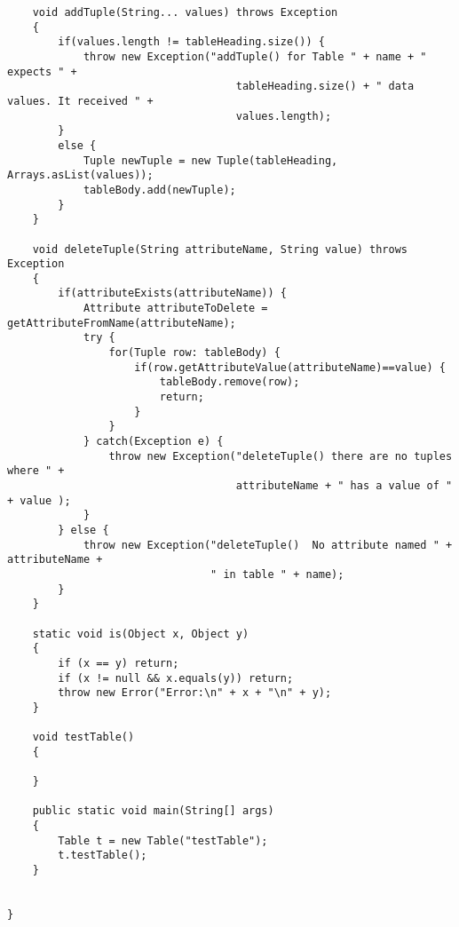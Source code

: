 \documentclass[11pt]{article} %
\begin{document}
\begin{lstlisting}
    void addTuple(String... values) throws Exception
    {
        if(values.length != tableHeading.size()) {
            throw new Exception("addTuple() for Table " + name + " expects " +
                                    tableHeading.size() + " data values. It received " +
                                    values.length);
        }
        else {
            Tuple newTuple = new Tuple(tableHeading, Arrays.asList(values));
            tableBody.add(newTuple);
        }
    }
    
    void deleteTuple(String attributeName, String value) throws Exception
    {
        if(attributeExists(attributeName)) {
            Attribute attributeToDelete = getAttributeFromName(attributeName);
            try {
                for(Tuple row: tableBody) {
                    if(row.getAttributeValue(attributeName)==value) {
                        tableBody.remove(row);
                        return;
                    }
                }
            } catch(Exception e) {
                throw new Exception("deleteTuple() there are no tuples where " +
                                    attributeName + " has a value of " + value );
            }
        } else {
            throw new Exception("deleteTuple()  No attribute named " + attributeName +
                                " in table " + name);
        }
    }

    static void is(Object x, Object y)
    {
        if (x == y) return;
        if (x != null && x.equals(y)) return;
        throw new Error("Error:\n" + x + "\n" + y);
    }

    void testTable()
    {
        
    }

    public static void main(String[] args)
    {
        Table t = new Table("testTable");
        t.testTable();
    }


}

\end{lstlisting}
\end{document}
